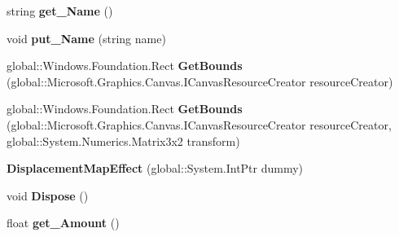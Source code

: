 \begin{DoxyCompactItemize}
string {\bfseries get\+\_\+\+Name} ()
\item 
\mbox{\label{class_microsoft_1_1_graphics_1_1_canvas_1_1_effects_1_1_displacement_map_effect_ab487b040a6866d4895664025280310b5}} 
void {\bfseries put\+\_\+\+Name} (string name)
\item 
\mbox{\label{class_microsoft_1_1_graphics_1_1_canvas_1_1_effects_1_1_displacement_map_effect_a2e6badea68c005f4b53a34c1bc09a0cd}} 
global\+::\+Windows.\+Foundation.\+Rect {\bfseries Get\+Bounds} (global\+::\+Microsoft.\+Graphics.\+Canvas.\+I\+Canvas\+Resource\+Creator resource\+Creator)
\item 
\mbox{\label{class_microsoft_1_1_graphics_1_1_canvas_1_1_effects_1_1_displacement_map_effect_ae496e3721b3056df38f4cf85aac6cabe}} 
global\+::\+Windows.\+Foundation.\+Rect {\bfseries Get\+Bounds} (global\+::\+Microsoft.\+Graphics.\+Canvas.\+I\+Canvas\+Resource\+Creator resource\+Creator, global\+::\+System.\+Numerics.\+Matrix3x2 transform)
\item 
\mbox{\label{class_microsoft_1_1_graphics_1_1_canvas_1_1_effects_1_1_displacement_map_effect_ae0d7553bd7b893a6a8c39c315ffc0105}} 
{\bfseries Displacement\+Map\+Effect} (global\+::\+System.\+Int\+Ptr dummy)
\item 
\mbox{\label{class_microsoft_1_1_graphics_1_1_canvas_1_1_effects_1_1_displacement_map_effect_a3bc67d76982886e7a8944528ef1e212c}} 
void {\bfseries Dispose} ()
\item 
\mbox{\label{class_microsoft_1_1_graphics_1_1_canvas_1_1_effects_1_1_displacement_map_effect_ab9cf484fc72d3724bf8b3090cfadbdc0}} 
float {\bfseries get\+\_\+\+Amount} ()
\item 
\mbox{\label{class_microsoft_1_1_graphics_1_1_canvas_1_1_effects_1_1_displacement_map_effect_a778035a283ef8ab94cb70d3718c04523}} 

\end{DoxyCompactItemize}

